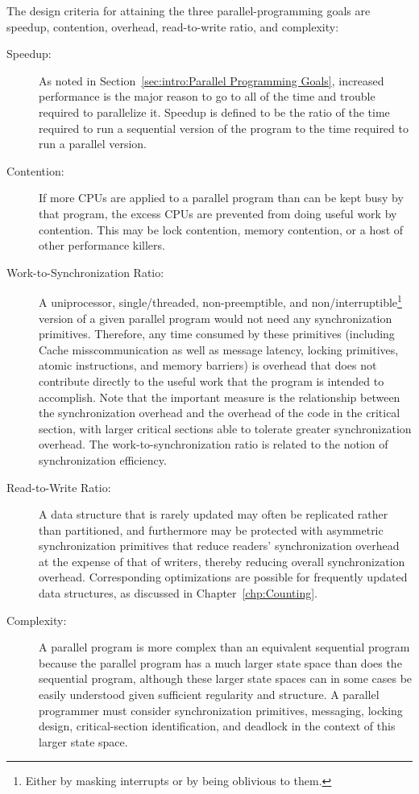 The design criteria for attaining the three parallel-programming goals
are speedup,
contention, overhead, read-to-write ratio, and complexity:
\begin{description}
\item[Speedup:]  As noted in
	Section~\ref{sec:intro:Parallel Programming Goals},
	increased performance is the major reason
	to go to all of the time and trouble
	required to parallelize it.
	Speedup is defined to be the ratio of the time required
	to run a sequential version of the program to the time
	required to run a parallel version.
\item[Contention:]  If more CPUs are applied to a parallel
	program than can be kept busy by that program,
	the excess CPUs are prevented from doing
	useful work by contention.
	This may be lock contention, memory contention, or a host
	of other performance killers.
\item[Work-to-Synchronization Ratio:]  A uniprocessor,
	single\-/threaded, non-preemptible, and non\-/interruptible\footnote{
		Either by masking interrupts or by being oblivious to them.}
	version of a given parallel
	program would not need any synchronization primitives.
	Therefore, any time consumed by these primitives
	(including %
	{Cache miss}{communication} as well as
	message latency, locking primitives, atomic instructions,
	and memory barriers)
	is overhead that does not contribute directly to the useful
	work that the program is intended to accomplish.
	Note that the important measure is the
	relationship between the synchronization overhead
	and the overhead of the code in the critical section, with larger
	critical sections able to tolerate greater synchronization overhead.
	The work-to-synchronization ratio is related to
	the notion of synchronization efficiency.
\item[Read-to-Write Ratio:]  A data structure that is
	rarely updated may often be replicated rather than partitioned,
	and furthermore may be protected with asymmetric
	synchronization primitives that reduce readers' synchronization
	overhead at the expense of that of writers, thereby
	reducing overall synchronization overhead.
	Corresponding optimizations are possible for frequently
	updated data structures, as discussed in
	Chapter~\ref{chp:Counting}.
\item[Complexity:]  A parallel program is more complex than
	an equivalent sequential program because the parallel
	program has a much larger state space than does the
	sequential program, although these larger state spaces
	can in some cases be easily understood given sufficient
	regularity and structure.
	A parallel programmer must
	consider synchronization primitives, messaging, locking design,
	critical-section identification,
	and deadlock in the context of this larger state space.


\end{description}
